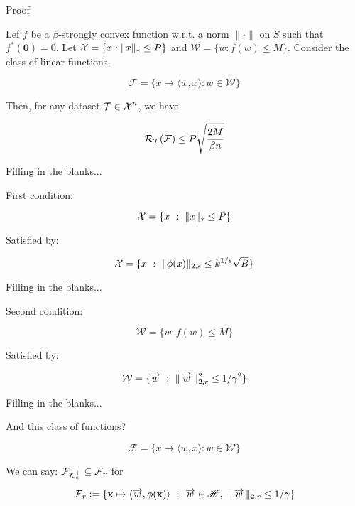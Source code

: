 \begin{frame}{Proof}

  \begin{theorem}[9 Generalization]
    Lef $f$ be a $\beta$-strongly convex function w.r.t. a norm $\|\cdot \|$ on $S$ such that
    $f^*(\mathbf{0}) = 0$. Let $\operatorname{\mathcal{X}} = \{ x : \|x\|_* \leq P\}$ and $\mathcal{W} = \{ w : f(w) \leq M \}$.
    Consider the class of linear functions,

    \[ \mathcal{F} = \{ x \mapsto \langle w,x \rangle : w \in \mathcal{W} \}  \]

    Then, for any dataset $\mathcal{T} \in \operatorname{\mathcal{X}}^n$, we have

    \[ \operatorname{\mathcal{R}}_{\mathcal{T}}(\mathcal{F}) \leq P \sqrt{ \frac{2M}{\beta n}  } \]
  \end{theorem}
      

  
\end{frame}

\begin{frame}{Filling in the blanks...}

  First condition:
  
  \[ \operatorname{\mathcal{X}} = \{ x ~:~ \|x\|_* \leq P\} \]

  Satisfied by:

  \[ \operatorname{\mathcal{X}} = \{ x ~:~ \|\phi(x)\|_{2,s} \leq k^{1/s} \sqrt{B}\} \]

  
\end{frame}

\begin{frame}{Filling in the blanks...}

  Second condition:

  \[ \mathcal{W} = \{ w : f(w) \leq M \}  \]

  Satisfied by:
  
  \[ \mathcal{W} = \{ \operatorname{\overrightarrow{w}} ~:~ \| \operatorname{\overrightarrow{w}}\|^2_{2,r} \leq 1/\gamma^2 \}  \]
  
\end{frame}


\begin{frame}{Filling in the blanks...}

  And this class of functions?
  
  \[ \mathcal{F} = \{ x \mapsto \langle w,x \rangle : w \in \mathcal{W} \}  \]

  We can say: $ \operatorname{\mathcal{F}}_{\mathcal{K}^+_c} \subseteq \operatorname{\mathcal{F}}_r $ for

  \[ \operatorname{\mathcal{F}}_r := \{ \operatorname{\mathbf{x}} \mapsto \langle \operatorname{\overrightarrow{w}}, \phi(\operatorname{\mathbf{x}}) \rangle ~:~ \operatorname{\overrightarrow{w}} \in \operatorname{\mathscr{H}}, ~ \| \operatorname{\overrightarrow{w}} \|_{2,r} \leq 1/\gamma \} \]
  
  
\end{frame}




